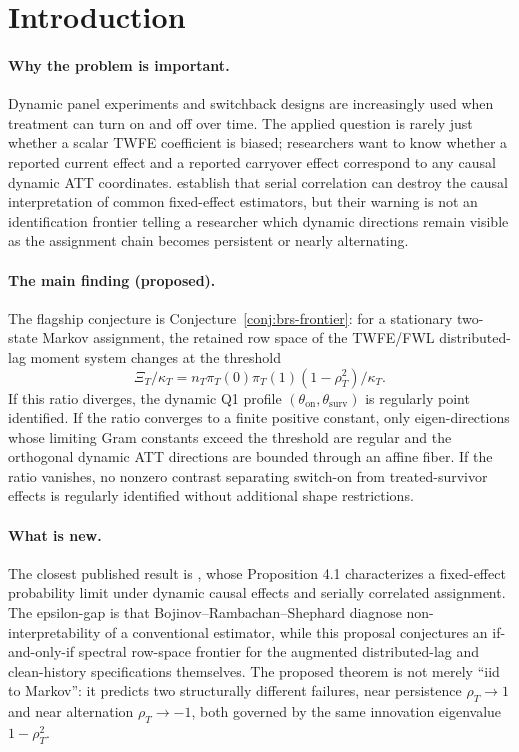 \documentclass[11pt]{article}
\theoremstyle{definition}
\theoremstyle{plain}
\theoremstyle{remark}
\begin{document}
\section{Introduction}
\paragraph{Why the problem is important.}
Dynamic panel experiments and switchback designs are increasingly used when treatment can turn on and off over time.
The applied question is rarely just whether a scalar TWFE coefficient is biased; researchers want to know whether a reported current effect and a reported carryover effect correspond to any causal dynamic ATT coordinates.
\citet{bojinov2021panel} establish that serial correlation can destroy the causal interpretation of common fixed-effect estimators, but their warning is not an identification frontier telling a researcher which dynamic directions remain visible as the assignment chain becomes persistent or nearly alternating.

\paragraph{The main finding (proposed).}
The flagship conjecture is Conjecture~\ref{conj:brs-frontier}: for a stationary two-state Markov assignment, the retained row space of the TWFE/FWL distributed-lag moment system changes at the threshold
\[
\Xi_T/\kappa_T
= n_T\pi_T(0)\pi_T(1)(1-\rho_T^2)/\kappa_T .
\]
If this ratio diverges, the dynamic Q1 profile \((\theta_{\mathrm{on}},\theta_{\mathrm{surv}})\) is regularly point identified.
If the ratio converges to a finite positive constant, only eigen-directions whose limiting Gram constants exceed the threshold are regular and the orthogonal dynamic ATT directions are bounded through an affine fiber.
If the ratio vanishes, no nonzero contrast separating switch-on from treated-survivor effects is regularly identified without additional shape restrictions.

\paragraph{What is new.}
The closest published result is \citet{bojinov2021panel}, whose Proposition 4.1 characterizes a fixed-effect probability limit under dynamic causal effects and serially correlated assignment.
The epsilon-gap is that Bojinov--Rambachan--Shephard diagnose non-interpretability of a conventional estimator, while this proposal conjectures an if-and-only-if spectral row-space frontier for the augmented distributed-lag and clean-history specifications themselves.
The proposed theorem is not merely ``iid to Markov'': it predicts two structurally different failures, near persistence \(\rho_T\to1\) and near alternation \(\rho_T\to-1\), both governed by the same innovation eigenvalue \(1-\rho_T^2\).
\end{document}
